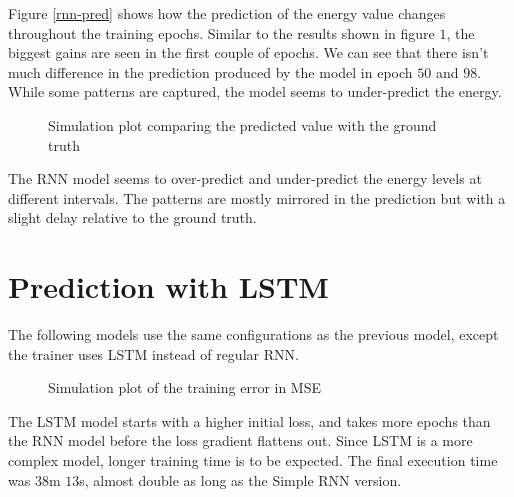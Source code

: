 \documentclass[a4paper, article, oneside, USenglish, IN5460]{memoir}
\begin{document}
Figure \ref{rnn-pred} shows how the prediction of the energy value changes throughout the training epochs. Similar to the results shown in figure $1$, the biggest gains are seen in the first couple of epochs. We can see that there isn't much difference in the prediction produced by the model in epoch $50$ and $98$. While some patterns are captured, the model seems to under-predict the energy.

\begin{figure}[H]
  \centering
    
  \caption{Simulation plot comparing the predicted value with the ground truth}
\end{figure}

The RNN model seems to over-predict and under-predict the energy levels at different intervals. The patterns are mostly mirrored in the prediction but with a slight delay relative to the ground truth.




\section{Prediction with LSTM}

The following models use the same configurations as the previous model, except the trainer uses LSTM instead of regular RNN.

\begin{figure}[H]
  \centering
    
  \caption{Simulation plot of the training error in MSE}
\end{figure}

The LSTM model starts with a higher initial loss, and takes more epochs than the RNN model before the loss gradient flattens out. Since LSTM is a more complex model, longer training time is to be expected. The final execution time was $38$m $13$s, almost double as long as the Simple RNN version.
\end{document}
